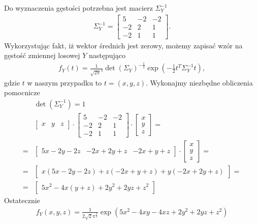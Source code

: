 Do wyznaczenia gęstości potrzebna jest macierz $ \Sigma_Y^{-1} $
\begin{gather*}
\Sigma_Y^{-1}=
\begin{bmatrix}
	5  & -2 & -2 \\
	-2 & 2  & 1  \\
	-2 & 1  & 1
\end{bmatrix}.
\end{gather*}
Wykorzystując fakt, iż wektor średnich jest zerowy, możemy zapisać wzór na gęstość zmiennej losowej $ Y $ następująco
\begin{gather*}
f_Y(t)=\frac{1}{\sqrt{2\pi}^3}\det(\Sigma_Y)^{-\frac{1}{2}}
\exp\left(-\frac{1}{2}t^T\Sigma_Y^{-1}t\right),
\end{gather*}
gdzie $ t $ w naszym przypadku to $ t=(x,y,z) $.
Wykonajmy niezbędne obliczenia pomocnicze
\begin{align*}
&\det(\Sigma_Y^{-1})=1\\
&\begin{bmatrix}
	x & y & z
\end{bmatrix}\cdot
\begin{bmatrix}
	5  & -2 & -2 \\
	-2 & 2  & 1  \\
	-2 & 1  & 1
\end{bmatrix}\cdot
\begin{bmatrix}
	x \\
	y \\
	z
\end{bmatrix}
=\\=&
\begin{bmatrix}
	5 x-2 y-2 z & -2 x+2 y+z & -2 x+y+z
\end{bmatrix}\cdot
\begin{bmatrix}
	x \\
	y \\
	z
\end{bmatrix}
=\\=&
\begin{bmatrix}
	x (5 x-2 y-2 z)+z (-2 x+y+z)+y (-2 x+2 y+z)
\end{bmatrix}
=\\=&
\begin{bmatrix}
	5 x^2-4 x (y+z)+2 y^2+2 y z+z^2
\end{bmatrix}
\end{align*}
Ostatecznie
\begin{gather*}
f_Y(x,y,z)=\frac{1}{2\sqrt{2}\pi^{\frac{3}{2}}}\exp \left(5 x^2-4 x y-4 x z+2 y^2+2 y z+z^2\right)
\end{gather*}


